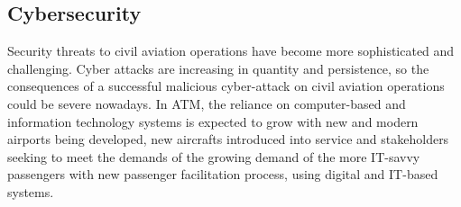 \subsection{Cybersecurity}

Security threats to civil aviation operations have become more sophisticated and challenging.
Cyber attacks are increasing in quantity and persistence, so the consequences of a successful malicious cyber-attack on civil aviation operations could be severe nowadays.
In ATM, the reliance on computer-based and information technology systems is expected to grow with new and modern airports being developed, new aircrafts introduced into service and stakeholders seeking to meet the demands of the growing demand of the more IT-savvy passengers with new passenger facilitation process, using digital and IT-based systems. 


